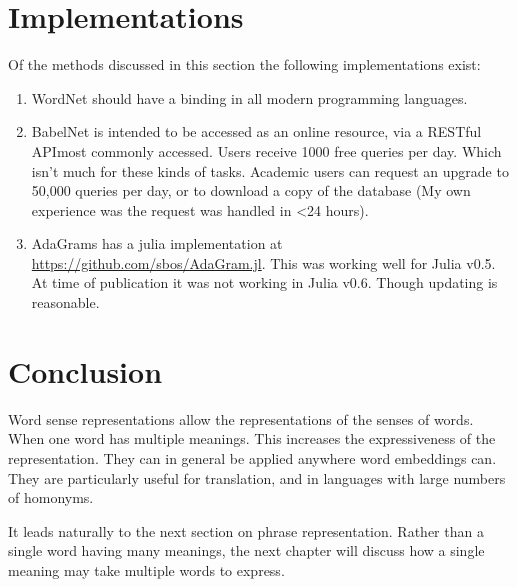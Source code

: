 \documentclass[12pt,parskip]{komatufte}
\begin{document}

\section{Implementations}
Of the methods discussed in this section the following implementations exist:
\begin{enumerate}
	\item WordNet \parencite{tengi1998design} should have a binding in all modern programming languages.
	\item BabelNet \parencite{navigli2010babelnet} is intended to be accessed as an online resource, via a RESTful APImost commonly accessed. Users receive 1000 free queries per day. Which isn't much for these kinds of tasks. Academic users can request an upgrade to 50,000 queries per day, or to download a copy of the database (My own experience was the request was handled in <24 hours).
	\item AdaGrams \parencite{AdaGrams} has a julia implementation at \url{https://github.com/sbos/AdaGram.jl}. This was working well for Julia v0.5. At time of publication it was not working in Julia v0.6. Though updating is reasonable.
\end{enumerate}


\section{Conclusion}
Word sense representations allow the representations of the senses of words.
When one word has multiple meanings.
This increases the expressiveness of the representation.
They can in general be applied anywhere word embeddings can.
They are particularly useful for translation,
and in languages with large numbers of homonyms.

It leads naturally to the next section on phrase representation. Rather than a single word having many meanings, the next chapter will discuss how a single meaning may take multiple words to express.
\end{document}

